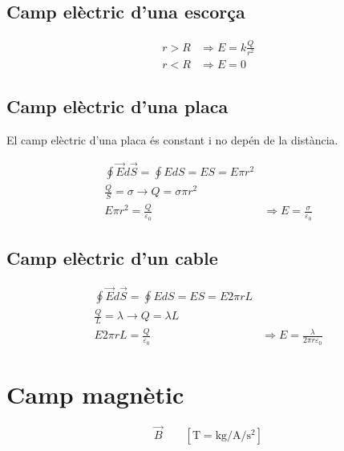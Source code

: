 \subsection{Camp elèctric d'una escorça}
\label{sub:camp_electric_d_una_escorca}

\begin{align}
    r > R & \Rightarrow E = k \frac{Q}{r^2} \\
    r < R & \Rightarrow E = 0
\end{align}

\subsection{Camp elèctric d'una placa}
\label{sub:camp_electric_d_una_placa}

El camp elèctric d'una placa és constant i no depén de la distància.

\begin{align}
    \oint \vec{E}d\vec{S} = \oint EdS = ES = E\pi r^2 \nonumber \\
    \frac{Q}{S} = \sigma \rightarrow Q = \sigma \pi r^2 \nonumber \\
    E\pi r^2 = \frac{Q}{\varepsilon_0} & \Rightarrow E = \frac{\sigma}{\varepsilon_0}
\end{align}

\subsection{Camp elèctric d'un cable}
\label{sub:camp_electric_d_un_cable}

\begin{align}
    \oint \vec{E}d\vec{S} = \oint EdS = ES = E2\pi rL \nonumber \\
    \frac{Q}{L} = \lambda \rightarrow Q = \lambda L \nonumber \\
    E 2\pi rL = \frac{Q}{\varepsilon_0} &\Rightarrow E = \frac{\lambda}{2\pi r\varepsilon_0}
\end{align}

\section{Camp magnètic}
\label{sec:camp_magnetic}

\begin{equation}
    \vec{B} \qquad \left[ \si{\tesla} = \si{\kilo\gram\per\ampere\per\second\squared}\right]
\end{equation}

